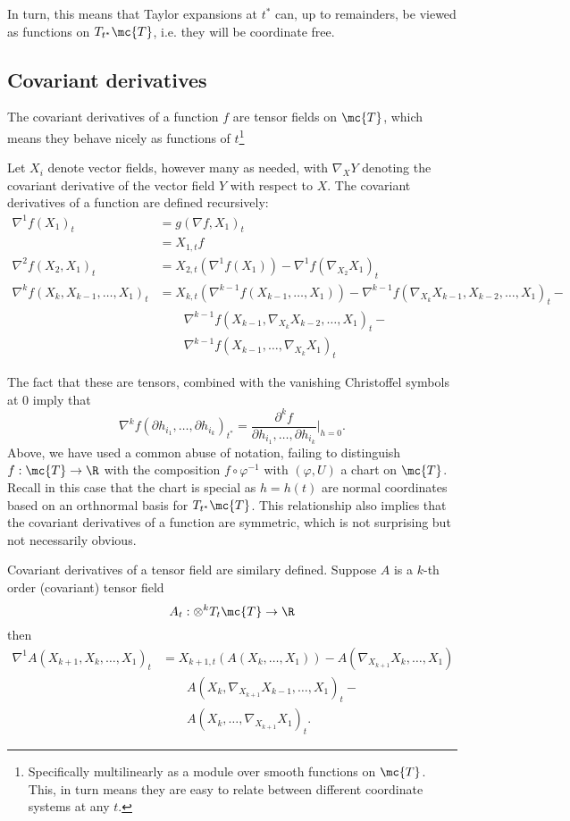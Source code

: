 \documentclass{article}
\begin{document}
In turn, this means that Taylor expansions at $t^*$ can, up to remainders, be viewed as functions on $T_{t^*}\mc{T}$, i.e. they will be coordinate free.

\subsection{Covariant derivatives}

The covariant derivatives of a function $f$ are tensor fields on $\mc{T}$, which means they behave nicely
as functions of $t$\footnote{Specifically multilinearly as a module over smooth functions on $\mc{T}$. This,
in turn means they are easy to relate between different coordinate systems at any $t$.}

Let $X_i$ denote vector fields, however many as needed, with $\nabla_XY$ denoting
the covariant derivative of the vector field $Y$ with respect to $X$. The covariant
derivatives of a function are defined recursively:
$$
\begin{aligned}
  \nabla^1 f(X_1)_t &= g(\nabla f, X_1)_t \\
  &= X_{1,t}f \\
  \nabla^2 f(X_2, X_1)_t &= X_{2,t}(\nabla^1 f(X_1)) - \nabla^1 f(\nabla_{X_2}X_1)_t \\
  \nabla^k f(X_k, X_{k-1}, \dots, X_1)_t &= X_{k,t}(\nabla^{k-1} f(X_{k-1}, \dots, X_1)) -
  \nabla^{k-1} f(\nabla_{X_k}X_{k-1}, X_{k-2}, \dots, X_1)_t - \\
&  \qquad   \nabla^{k-1} f(X_{k-1}, \nabla_{X_k}X_{k-2}, \dots, X_1)_t - \\
  & \qquad \nabla^{k-1} f(X_{k-1}, \dots, \nabla_{X_k}X_1)_t
  \end{aligned}
$$

The fact that these are tensors, combined with the vanishing Christoffel symbols at 0 imply that
$$
\nabla^k f(\partial h_{i_1}, \dots, \partial h_{i_k})_{t^*} = \frac{\partial^k f}{\partial h_{i_1}, \dots, \partial h_{i_k}} \biggl|_{h=0}.
$$
Above, we have used a common abuse of notation, failing to distinguish $f:\mc{T} \rightarrow \R$ with the
composition $f \circ \varphi^{-1}$ with $(\varphi, U)$ a chart on $\mc{T}$. Recall in this case that the
chart is special as $h=h(t)$ are normal coordinates based on an orthnormal basis for $T_{t^*}\mc{T}$. This relationship also implies that the covariant derivatives of a function are symmetric, which is not surprising but not necessarily obvious.

Covariant derivatives of a tensor field are similary defined. Suppose $A$ is a $k$-th order (covariant) tensor field
$$
A_t:\otimes^k T_t\mc{T} \to \R
$$
then 
$$
\begin{aligned}
  \nabla^1 A(X_{k+1}, X_k, \dots, X_1)_t &= X_{k+1,t}(A(X_k, \dots, X_1)) - A(\nabla_{X_{k+1}}X_k, \dots, X_1)  \\
  &  \qquad  A(X_{k}, \nabla_{X_{k+1}}X_{k-1}, \dots, X_1)_t - \\
  & \qquad A(X_{k}, \dots, \nabla_{X_{k+1}}X_1)_t.
\end{aligned}
$$
\end{document}
